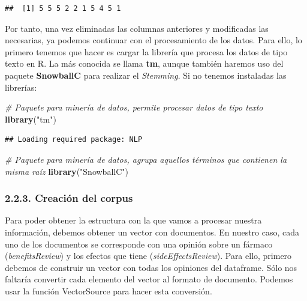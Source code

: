 \documentclass[spanish,]{article}
\newenvironment{Shaded}{\begin{snugshade}}{\end{snugshade}}
\newcommand{\KeywordTok}[1]{\textcolor[rgb]{0.13,0.29,0.53}{\textbf{#1}}}
\newcommand{\DecValTok}[1]{\textcolor[rgb]{0.00,0.00,0.81}{#1}}
\newcommand{\StringTok}[1]{\textcolor[rgb]{0.31,0.60,0.02}{#1}}
\newcommand{\CommentTok}[1]{\textcolor[rgb]{0.56,0.35,0.01}{\textit{#1}}}
\newcommand{\OperatorTok}[1]{\textcolor[rgb]{0.81,0.36,0.00}{\textbf{#1}}}
\newcommand{\NormalTok}[1]{#1}
\begin{document}
\begin{Shaded}
\end{Shaded}

\begin{verbatim}
##  [1] 5 5 5 2 2 1 5 4 5 1
\end{verbatim}

Por tanto, una vez eliminadas las columnas anteriores y modificadas las
necesarias, ya podemos continuar con el procesamiento de los datos. Para
ello, lo primero tenemos que hacer es cargar la librería que procesa los
datos de tipo texto en R. La más conocida se llama \textbf{tm}, aunque
también haremos uso del paquete \textbf{SnowballC} para realizar el
\emph{Stemming}. Si no tenemos instaladas las librerías:

\begin{Shaded}
\begin{Highlighting}[]
\CommentTok{# Paquete para minería de datos, permite procesar datos de tipo texto}
\KeywordTok{library}\NormalTok{(}\StringTok{"tm"}\NormalTok{)}
\end{Highlighting}
\end{Shaded}

\begin{verbatim}
## Loading required package: NLP
\end{verbatim}

\begin{Shaded}
\begin{Highlighting}[]
\CommentTok{# Paquete para minería de datos, agrupa aquellos términos que contienen la misma raíz}
\KeywordTok{library}\NormalTok{(}\StringTok{"SnowballC"}\NormalTok{)}
\end{Highlighting}
\end{Shaded}

\subsubsection{2.2.3. Creación del corpus}\label{creacion-del-corpus}

Para poder obtener la estructura con la que vamos a procesar nuestra
información, debemos obtener un vector con documentos. En nuestro caso,
cada uno de los documentos se corresponde con una opinión sobre un
fármaco (\emph{benefitsReview}) y los efectos que tiene
(\emph{sideEffectsReview}). Para ello, primero debemos de construir un
vector con todas los opiniones del dataframe. Sólo nos faltaría
convertir cada elemento del vector al formato de documento. Podemos usar
la función VectorSource para hacer esta conversión.
\end{document}
